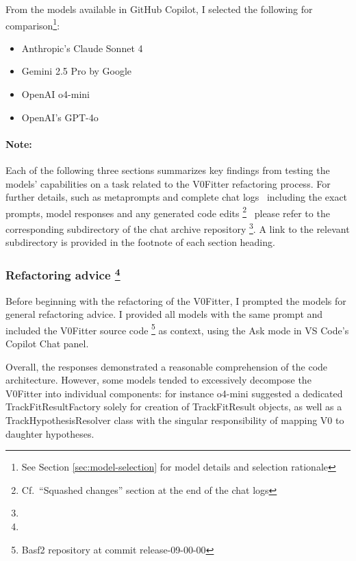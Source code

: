 From the models available in GitHub Copilot, I selected the following for comparison\footnote{%
  See Section \ref{sec:model-selection} for model details and selection rationale
}:
\begin{itemize}
  \item Anthropic's Claude Sonnet 4 \cite{claude-sonnet4}
  \item Gemini 2.5 Pro by Google \cite{gemini25pro}
  \item OpenAI o4-mini \cite{o4mini}
  \item OpenAI's GPT-4o \cite{gpt-4o}
\end{itemize}

\paragraph{Note:}
Each of the following three sections summarizes key findings from testing the models' capabilities on a task related to the V0Fitter refactoring process.
For further details, such as metaprompts and complete chat logs \textemdash\ including the exact prompts, model responses and any generated code edits%
\footnote{Cf.\ \enquote{Squashed changes} section at the end of the chat logs}
\textemdash\ please refer to the corresponding subdirectory of the chat archive repository%
\footnote{}.
A link to the relevant subdirectory is provided in the footnote of each section heading.

\def\sectitle{Refactoring advice}
\subsubsection[\sectitle]%
{\sectitle
  \footnote{}
}\label{sec:refactoring-advice}
Before beginning with the refactoring of the V0Fitter, I prompted the models for general refactoring advice.
I provided all models with the same prompt and included the V0Fitter source code%
\footnote{Basf2 repository at commit release-09-00-00}
as context, using the Ask mode in VS Code's Copilot Chat panel.

Overall, the responses demonstrated a reasonable comprehension of the code architecture. However, some models tended to excessively decompose the V0Fitter into individual components:
for instance o4-mini suggested a dedicated TrackFitResultFactory solely for creation of TrackFitResult objects, as well as a TrackHypothesisResolver class with the singular responsibility of mapping V0 to daughter hypotheses.

